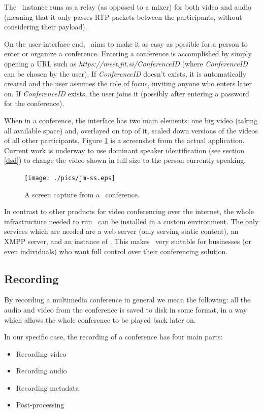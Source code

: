 \documentclass[twoside,openright,a4paper,12pt,english]{article}
\begin{document}
The \jvb\ instance runs as a relay (as opposed to a mixer) for both video and
audio (meaning that it only passes RTP packets between the participants,
without considering their payload).

\smallskip
On the user-interface end, \jm\ aims to make it as easy as possible for a
person to enter or organize a conference. 
Entering a conference is accomplished by simply opening a URL such as \emph{https://meet.jit.si/ConferenceID} 
(where \emph{ConferenceID} can be chosen by the user). If \emph{ConferenceID}
doesn't exists, it is automatically created and
the user assumes the role of focus, inviting anyone who enters later on. If
\emph{ConferenceID} exists,
the user joins it (possibly after entering a password for the conference).

When in a conference, the interface has two main elements: one big video
(taking all available space) and, overlayed on top of it,
scaled down versions of the videos of all other participants. Figure
\ref{jm-ss} is a screenshot from the actual application. Current work is underway to
use dominant speaker identification (see section \ref{dsd}) to change the video
shown in full size to the person currently speaking.

\begin{figure}[h]
    \texttt{[image: ./pics/jm-ss.eps]}
    \caption{A screen capture from a \jm\ conference.}
    \label{jm-ss}
\end{figure}

\medskip
In contrast to other products for video conferencing over the internet, the
whole infrastructure needed to run \jm\ can be installed in a custom
environment. The only services which are needed are a web server
(only serving static content), an XMPP server, and an instance of \jvb. This
makes \jm\ very suitable for businesses (or even individuals) who want full
control over their conferencing solution.



\subsection{Recording}
\label{intro-recording}
By recording a multimedia conference in general we mean the following: all the
audio and video from the conference
is saved to disk in some format, in a way which allows the whole conference to
be played back later on.

\medskip
In our specific case, the recording of a conference has four main parts:
\begin{itemize}
\item{Recording video}
\item{Recording audio}
\item{Recording metadata}
\item{Post-processing}
\end{itemize}
\end{document}
